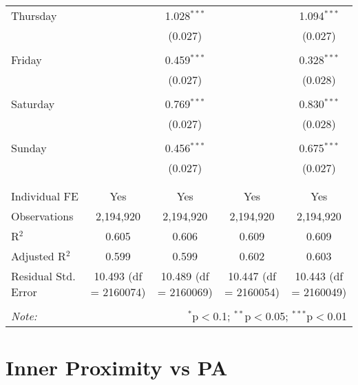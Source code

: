 \documentclass[
]{article}
\begin{document}
\begin{table}[!htbp]
{\begin{tabular}{@{\extracolsep{5pt}}lcccc}
 Thursday &  & 1.028$^{***}$ &  & 1.094$^{***}$ \\ 
  &  & (0.027) &  & (0.027) \\ 
  & & & & \\ 
 Friday &  & 0.459$^{***}$ &  & 0.328$^{***}$ \\ 
  &  & (0.027) &  & (0.028) \\ 
  & & & & \\ 
 Saturday &  & 0.769$^{***}$ &  & 0.830$^{***}$ \\ 
  &  & (0.027) &  & (0.028) \\ 
  & & & & \\ 
 Sunday &  & 0.456$^{***}$ &  & 0.675$^{***}$ \\ 
  &  & (0.027) &  & (0.027) \\ 
  & & & & \\ 
\hline \\[-1.8ex] 
Individual FE & Yes & Yes & Yes & Yes \\ 
Observations & 2,194,920 & 2,194,920 & 2,194,920 & 2,194,920 \\ 
R$^{2}$ & 0.605 & 0.606 & 0.609 & 0.609 \\ 
Adjusted R$^{2}$ & 0.599 & 0.599 & 0.602 & 0.603 \\ 
Residual Std. Error & 10.493 (df = 2160074) & 10.489 (df = 2160069) & 10.447 (df = 2160054) & 10.443 (df = 2160049) \\ 
\hline 
\hline \\[-1.8ex] 
\textit{Note:}  & \multicolumn{4}{r}{$^{*}$p$<$0.1; $^{**}$p$<$0.05; $^{***}$p$<$0.01} \\ 
\end{tabular}
} 
\end{table} 
\newpage
\section{Inner Proximity vs PA}
\end{document}
